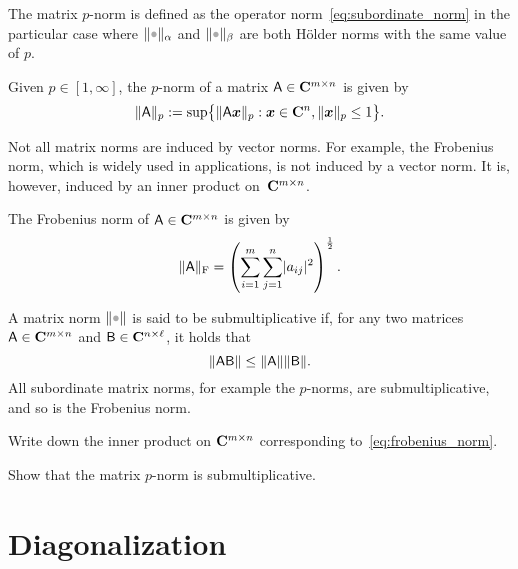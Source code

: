 The matrix $p$-norm is defined as the operator norm~\eqref{eq:subordinate_norm} in the particular case
where $\norm{\placeholder}_{\alpha}$ and $\norm{\placeholder}_{\beta}$ are both H\"older norms with the same value of $p$.
\begin{definition}
Given $p \in [1, \infty]$,
the $p$-norm of a matrix $\mathsf A \in \mathbf C^{m\times n}$ is given by
\begin{equation}
    \label{eq:matrix_p_norm}
    \lVert\mathsf A\rVert_{p} := \sup \bigl\{ \lVert\mathsf A \mathbf{\boldsymbol{x}}\rVert_{p} : \mathbf{\boldsymbol{x}} \in \mathbf C^n, \lVert\mathbf{\boldsymbol{x}}\rVert_{p} \leq 1 \bigr\}.
\end{equation}
\end{definition}
Not all matrix norms are induced by vector norms.
For example, the Frobenius norm,
which is widely used in applications,
is not induced by a vector norm.
It is, however, induced by an inner product on~$\mathbf C^{m \times n}$.
\begin{definition}
    The Frobenius norm of $\mathsf A \in \mathbf C^{m\times n}$ is given by
    \begin{equation}
        \label{eq:frobenius_norm}
        \lVert\mathsf A\rVert_{\rm F} = \left( \sum_{i=1}^{m} \sum_{j=1}^{n} \lvert a_{ij}\rvert^2 \right)^{\frac{1}{2}}.
    \end{equation}
\end{definition}

A matrix norm $\norm{\placeholder}$ is said to be submultiplicative if,
for any two matrices $\mathsf A \in \mathbf C^{m \times n}$ and $\mathsf B \in \mathbf C^{n \times \ell}$,
it holds that
\[
    \lVert\mathsf A \mathsf B\rVert \leq \lVert\mathsf A\rVert \lVert\mathsf B\rVert.
\]
All subordinate matrix norms,
for example the $p$-norms, are submultiplicative,
and so is the Frobenius norm.

\begin{exercise}
    Write down the inner product on $\mathbf C^{m \times n}$ corresponding to~\eqref{eq:frobenius_norm}.
\end{exercise}
\begin{exercise}
    Show that the matrix $p$-norm is submultiplicative.
\end{exercise}

\section{Diagonalization}%
\label{sec:diagonalization}

